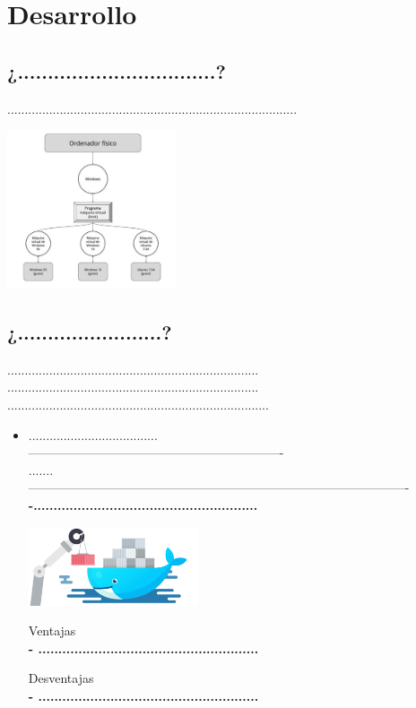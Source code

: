\documentclass[twoside,twocolumn]{article}
\begin{document}
\section{Desarrollo}

\subsection{¿.................................?}

...................................................................................

\begin{center}
	\includegraphics[width=5cm]{./Imagenes/virtualizacion} 
	\end{center}




\subsection{¿........................?}

........................................................................\\
........................................................................\\
...........................................................................

\begin{itemize}
\item .....................................
\\ -------------------------------------------------------------
\\.......
\\-------------------------------------------------------------------------------------------
\\ \textbf{-........................................................}


\begin{center}
	\includegraphics[width=5cm]{./Imagenes/docker} 
	\end{center}

Ventajas
\\ \textbf{- .......................................................}
 

Desventajas
\\ \textbf{- .......................................................}
\end{itemize} 
\end{document}
